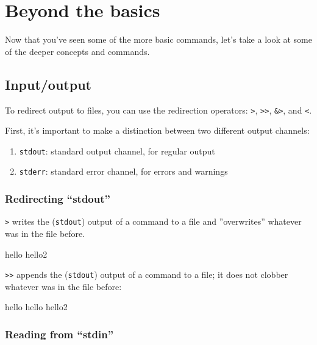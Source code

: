\chapter{Beyond the basics}

Now that you've seen some of the more basic commands, let's take a look at some
of the deeper concepts and commands.

\section{Input/output}

To redirect output to files, you can use the redirection operators: \verb|>|,
\verb|>>|, \verb|&>|, and \verb|<|.

First, it's important to make a distinction between two different output
channels:

\begin{enumerate}
 \item \verb|stdout|: standard output channel, for regular output
 \item \verb|stderr|: standard error channel, for errors and warnings
\end{enumerate}

\subsection{Redirecting ``stdout''}

\verb|>| writes the (\verb|stdout|) output of a command to a file and ''overwrites''
whatever was in the file before.

\begin{prompt}
hello
hello2
\end{prompt}

\verb|>>| appends the (\verb|stdout|) output of a command to a file; it does not clobber
whatever was in the file before:

\begin{prompt}
hello
hello
hello2
\end{prompt}

\subsection{Reading from ``stdin''}

